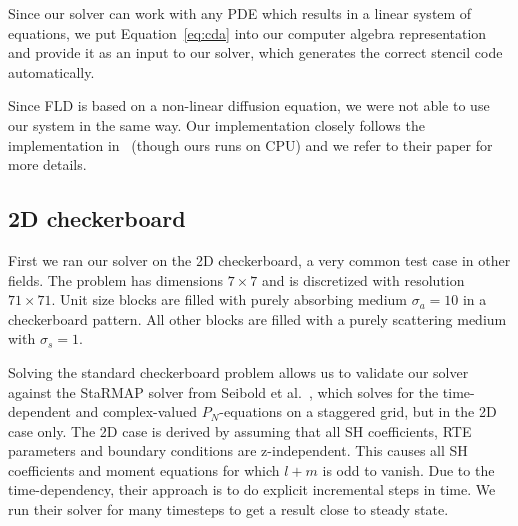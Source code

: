 \documentclass{egpubl}
\newcommand{\nocontentsline}[3]{}
\newcommand{\tocless}[2]{\bgroup\let\addcontentsline=\nocontentsline#1{#2}\egroup}
\begin{document}
Since our solver can work with any PDE which results in a linear system of equations, we put Equation~\ref{eq:cda} into our computer algebra representation and provide it as an input to our solver, which generates the correct stencil code automatically.

Since FLD is based on a non-linear diffusion equation, we were not able to use our system in the same way. Our implementation closely follows the implementation in~\cite{Koerner14} (though ours runs on CPU) and we refer to their paper for more details.

\tocless\subsection{2D checkerboard}

First we ran our solver on the 2D checkerboard, a very common test case in other fields. The problem has dimensions $7\times 7$ and is discretized with resolution $71\times 71$. Unit size blocks are filled with purely absorbing medium $\sigma_a=10$ in a checkerboard pattern. All other blocks are filled with a purely scattering medium with $\sigma_s=1$.

Solving the standard checkerboard problem allows us to validate our solver against the \textsf{StaRMAP} solver from Seibold et al.~\cite{Seibold14}, which solves for the time-dependent and complex-valued $P_N$-equations on a staggered grid, but in the 2D case only. The 2D case is derived by assuming that all SH coefficients, RTE parameters and boundary conditions are z-independent. This causes all SH coefficients and moment equations for which $l+m$ is odd to vanish. Due to the time-dependency, their approach is to do explicit incremental steps in time. We run their solver for many timesteps to get a result close to steady state.
\end{document}
